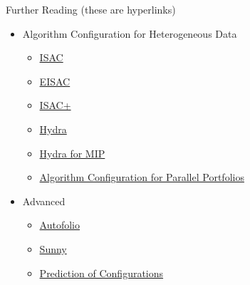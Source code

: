 \begin{frame}[c,fragile]{Further Reading (these are hyperlinks)}

\begin{itemize}
  \item Algorithm Configuration for Heterogeneous Data
  \begin{itemize}
    \item \href{https://docs.google.com/viewer?a=v&pid=sites&srcid=ZGVmYXVsdGRvbWFpbnx5dXJpbWFsaXRza3l8Z3g6MjM4ZDEyNzMwYTAxODQ2OA}{ISAC}
	\item \href{https://docs.google.com/viewer?a=v&pid=sites&srcid=ZGVmYXVsdGRvbWFpbnx5dXJpbWFsaXRza3l8Z3g6MWI1MWY3NmM2ZmNiZGE2Nw}{EISAC}
	\item \href{https://docs.google.com/viewer?a=v&pid=sites&srcid=ZGVmYXVsdGRvbWFpbnx5dXJpbWFsaXRza3l8Z3g6MTFiNTY4YjYwZTZiOGYzYg}{ISAC+}
    \item \href{http://www.cs.ubc.ca/~hoos/Publ/XuEtAl10.pdf}{Hydra}
    \item \href{http://www.cs.ubc.ca/~hoos/Publ/XuEtAl11.pdf}{Hydra for MIP}
    \item \href{https://ml.informatik.uni-freiburg.de/papers/17-AIJ-ACPP.pdf}{Algorithm Configuration for Parallel Portfolios}
  \end{itemize}
  \item Advanced
	\begin{itemize}
	  \item \href{http://aad.informatik.uni-freiburg.de/papers/15-JAIR-Autofolio.pdf}{Autofolio}
	  \item \href{http://arxiv.org/abs/1311.3353}{Sunny}
	  \item \href{http://dl.acm.org/citation.cfm?doid=2739480.2754673}{Prediction of Configurations}
	\end{itemize}
\end{itemize}
	
\end{frame}
